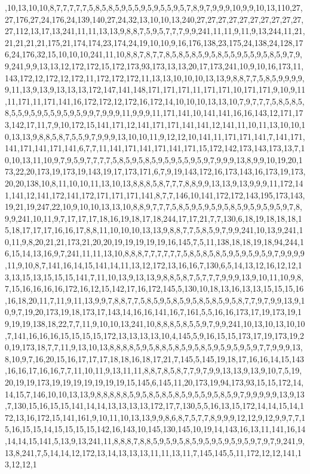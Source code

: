 ,10,13,10,10,8,7,7,7,7,7,5,8,5,8,5,9,5,5,9,5,9,5,5,9,5,7,8,9,7,9,9,9,10,9,9,10,13,110,27,27,176,27,24,176,24,139,140,27,24,32,13,10,10,13,240,27,27,27,27,27,27,27,27,27,27,27,112,13,17,13,241,11,11,13,13,9,8,8,7,5,9,5,7,7,7,9,9,241,11,11,9,11,9,13,244,11,21,21,21,21,21,175,21,174,174,23,174,24,19,10,10,9,16,176,138,23,175,24,138,24,128,176,24,176,32,15,10,10,10,241,11,10,8,8,7,8,7,7,8,5,8,5,8,5,9,5,8,5,5,9,5,5,9,5,8,5,9,7,9,9,241,9,9,13,13,12,172,172,15,172,173,93,173,13,13,20,17,173,241,10,9,10,16,173,11,143,172,12,172,12,172,11,172,172,172,11,13,13,10,10,10,13,13,9,8,8,7,7,5,8,5,9,9,9,9,9,11,13,9,13,9,13,13,13,172,147,141,148,171,171,171,11,171,171,10,171,171,9,10,9,11,11,171,11,171,141,16,172,172,12,172,16,172,14,10,10,10,13,13,10,7,9,7,7,7,5,8,5,8,5,8,5,5,9,5,9,5,5,9,5,9,5,9,9,7,9,9,9,11,9,9,9,11,171,141,10,141,141,16,16,143,12,171,173,142,17,11,7,9,10,172,15,141,171,12,141,171,171,141,141,12,141,11,10,11,13,10,10,10,13,13,9,8,8,5,8,7,5,5,9,7,9,9,9,13,10,10,11,9,12,12,10,141,11,171,171,141,7,141,171,141,171,141,171,141,6,7,7,11,141,171,141,171,141,171,15,172,142,173,143,173,13,7,10,10,13,11,10,9,7,9,5,9,7,7,7,7,5,8,5,9,5,8,5,9,5,9,5,5,9,5,9,7,9,9,9,13,8,9,9,10,19,20,173,22,20,173,19,173,19,143,19,17,173,171,6,7,9,19,143,172,16,173,143,16,173,19,173,20,20,138,10,8,11,10,10,11,13,10,13,8,8,8,5,8,7,7,7,8,8,9,9,13,13,9,13,9,9,9,11,172,141,141,12,141,172,141,172,171,171,171,141,8,7,7,146,10,141,172,172,143,195,173,143,19,21,19,247,22,10,9,10,10,13,13,10,8,8,9,7,7,7,5,8,5,9,5,9,5,9,5,8,5,9,5,9,5,9,5,9,7,8,9,9,241,10,11,9,7,17,17,17,18,16,19,18,17,18,244,17,17,21,7,7,130,6,18,19,18,18,18,15,18,17,17,17,16,16,17,8,8,11,10,10,10,13,13,9,8,8,7,7,5,8,5,9,7,9,9,241,10,13,9,241,10,11,9,8,20,21,21,173,21,20,20,19,19,19,19,19,16,145,7,5,11,138,18,18,19,18,94,244,16,15,14,13,16,9,7,241,11,11,13,10,8,8,8,7,7,7,7,7,7,5,8,5,8,5,8,5,9,5,9,5,9,5,9,7,9,9,9,9,11,9,10,8,7,141,16,14,15,141,14,11,13,12,172,13,16,16,7,130,6,5,14,13,12,16,12,12,13,13,15,13,15,15,15,141,7,11,10,13,9,13,13,9,8,8,5,8,7,5,7,7,7,9,9,9,13,9,10,11,10,9,8,7,15,16,16,16,16,172,16,12,15,142,17,16,172,145,5,130,10,18,13,16,13,13,15,15,15,16,16,18,20,11,7,11,9,11,13,9,9,7,8,8,7,7,5,8,5,9,5,8,5,9,5,8,5,8,5,9,5,8,7,7,9,7,9,9,13,9,10,9,7,19,20,173,19,18,173,17,143,14,16,16,141,16,7,161,5,5,16,16,173,17,19,173,19,19,19,19,138,18,22,7,7,11,9,10,10,13,241,10,8,8,8,5,8,5,5,9,7,9,9,241,10,13,10,13,10,10,7,141,16,16,16,15,15,15,15,172,13,13,13,13,10,4,145,5,9,16,15,15,173,17,19,173,19,20,19,173,18,7,7,11,9,13,10,13,8,8,8,8,5,9,5,8,8,5,8,5,9,5,8,5,9,5,9,5,9,5,9,7,7,9,9,9,13,8,10,9,7,16,20,15,16,17,17,17,18,18,16,18,17,21,7,145,5,145,19,18,17,16,16,14,15,143,16,16,17,16,16,7,7,11,10,11,9,13,11,11,8,8,7,8,5,8,7,7,9,7,9,9,13,13,9,13,9,10,7,5,19,20,19,19,173,19,19,19,19,19,19,19,15,145,6,145,11,20,173,19,94,173,93,15,15,172,14,14,15,7,146,10,10,13,13,9,8,8,8,8,8,5,9,5,8,5,8,5,8,5,9,5,5,9,5,8,5,9,7,9,9,9,9,9,13,9,13,7,130,15,16,15,15,141,14,14,13,13,13,13,172,17,7,130,5,5,16,13,15,172,14,14,15,14,172,13,16,172,15,141,161,9,10,11,10,13,13,9,9,8,6,8,7,5,7,7,8,9,9,9,12,12,9,12,9,9,7,7,15,16,15,15,14,15,15,15,15,142,16,143,10,145,130,145,10,19,14,143,16,13,11,141,16,14,14,14,15,141,5,13,9,13,241,11,8,8,8,7,8,8,5,9,5,9,5,8,5,9,5,9,5,9,5,9,5,9,7,9,7,9,241,9,13,8,241,7,5,14,14,12,172,13,14,13,13,13,11,11,13,11,7,145,145,5,11,172,12,12,141,13,12,12,1